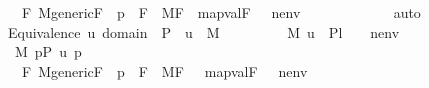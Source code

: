 \begin{isabellebody}
\ \ \ \ \ \ \ \ \ \ {\isacharparenleft}{\kern0pt}{\isasymforall}F{\isachardot}{\kern0pt}\ M{\isacharunderscore}{\kern0pt}generic{\isacharparenleft}{\kern0pt}F{\isacharparenright}{\kern0pt}\ {\isasymand}\ p\ {\isasymin}\ F\ {\isasymlongrightarrow}\ M{\isacharbrackleft}{\kern0pt}F{\isacharbrackright}{\kern0pt}{\isacharcomma}{\kern0pt}\ \ map{\isacharparenleft}{\kern0pt}val{\isacharparenleft}{\kern0pt}F{\isacharparenright}{\kern0pt}{\isacharcomma}{\kern0pt}\ {\isacharbrackleft}{\kern0pt}{\isasymtheta}{\isacharbrackright}{\kern0pt}\ {\isacharat}{\kern0pt}\ nenv\ {\isacharat}{\kern0pt}\ {\isacharbrackleft}{\kern0pt}{\isasympi}{\isacharbrackright}{\kern0pt}{\isacharparenright}{\kern0pt}\ {\isasymTurnstile}\ \ {\isacharquery}{\kern0pt}{\isasymchi}{\isacharparenright}{\kern0pt}{\isacharparenright}{\kern0pt}{\isachardoublequoteclose}\isanewline
\ \ \ \ \ \ \isamarkupfalse%
\ auto\ \isanewline
\ \ \isacommand{{\isacharbraceright}{\kern0pt}}\isamarkupfalse%
\isanewline
\ \ \isamarkupfalse%
\ \isanewline
\ \ \isamarkupfalse%
\ Equivalence{\isacharcolon}{\kern0pt}\ {\isachardoublequoteopen}u{\isasymin}\ domain{\isacharparenleft}{\kern0pt}{\isasympi}{\isacharparenright}{\kern0pt}\ {\isasymtimes}\ P\ {\isasymLongrightarrow}\ u\ {\isasymin}\ M\ {\isasymLongrightarrow}\ \isanewline
\ \ \ \ \ \ \ {\isacharparenleft}{\kern0pt}M{\isacharcomma}{\kern0pt}\ {\isacharbrackleft}{\kern0pt}u{\isacharbrackright}{\kern0pt}\ {\isacharat}{\kern0pt}\ {\isacharquery}{\kern0pt}Pl{}\ {\isacharat}{\kern0pt}\ {\isacharbrackleft}{\kern0pt}{\isasympi}{\isacharbrackright}{\kern0pt}\ {\isacharat}{\kern0pt}\ nenv\ {\isasymTurnstile}\ {\isacharquery}{\kern0pt}{\isasympsi}{\isacharparenright}{\kern0pt}\ {\isasymlongleftrightarrow}\ \isanewline
\ \ \ \ \ \ \ \ \ {\isacharparenleft}{\kern0pt}{\isasymexists}{\isasymtheta}{\isasymin}M{\isachardot}{\kern0pt}\ {\isasymexists}p{\isasymin}P{\isachardot}{\kern0pt}\ u\ {\isacharequal}{\kern0pt}{\isasymlangle}{\isasymtheta}{\isacharcomma}{\kern0pt}p{\isasymrangle}\ {\isasymand}\ \isanewline
\ \ \ \ \ \ \ \ \ \ {\isacharparenleft}{\kern0pt}{\isasymforall}F{\isachardot}{\kern0pt}\ M{\isacharunderscore}{\kern0pt}generic{\isacharparenleft}{\kern0pt}F{\isacharparenright}{\kern0pt}\ {\isasymand}\ p\ {\isasymin}\ F\ {\isasymlongrightarrow}\ M{\isacharbrackleft}{\kern0pt}F{\isacharbrackright}{\kern0pt}{\isacharcomma}{\kern0pt}\ \ \ map{\isacharparenleft}{\kern0pt}val{\isacharparenleft}{\kern0pt}F{\isacharparenright}{\kern0pt}{\isacharcomma}{\kern0pt}\ {\isacharbrackleft}{\kern0pt}{\isasymtheta}{\isacharbrackright}{\kern0pt}\ {\isacharat}{\kern0pt}\ nenv\ {\isacharat}{\kern0pt}{\isacharbrackleft}{\kern0pt}{\isasympi}{\isacharbrackright}{\kern0pt}{\isacharparenright}{\kern0pt}\ {\isasymTurnstile}\ \ {\isacharquery}{\kern0pt}{\isasymchi}{\isacharparenright}{\kern0pt}{\isacharparenright}{\kern0pt}{\isachardoublequoteclose}\ \isanewline

\end{isabellebody}
